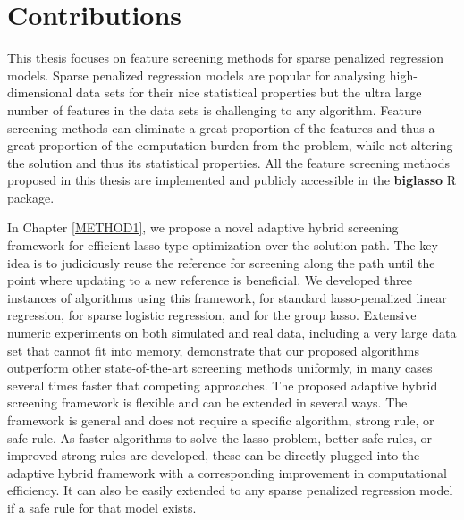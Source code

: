 \label{summary}

\section{Contributions}

This thesis focuses on feature screening methods for sparse penalized regression 
models. Sparse penalized regression models are popular for analysing high-dimensional data sets for their nice statistical properties but the ultra large number of features in the data sets is challenging to any algorithm. Feature screening methods can eliminate a great proportion of the features and thus a great proportion of the computation burden from the problem, while not altering the solution and thus its statistical properties. All the feature screening methods proposed in this thesis are implemented and publicly accessible in the \textbf{biglasso} R package.

In Chapter \ref{METHOD1}, we propose a novel adaptive hybrid screening framework for efficient lasso-type optimization over the solution path. The key idea is to judiciously reuse the reference for screening along the path until the point where updating to a new reference is beneficial. We developed three instances of algorithms using this framework, for standard lasso-penalized linear regression, for sparse logistic regression, and for the group lasso. Extensive numeric experiments on both simulated and real data, including a very large data set that cannot fit into memory, demonstrate that our proposed algorithms outperform other state-of-the-art screening methods uniformly, in many cases several times faster that competing approaches. The proposed adaptive hybrid screening framework is flexible and can be extended in several ways. The framework is general and does not require a specific algorithm, strong rule, or safe rule. As faster algorithms to solve the lasso problem, better safe rules, or improved strong rules are developed, these can be directly plugged into the adaptive hybrid framework with a corresponding improvement in computational efficiency. It can also be easily extended to any sparse penalized regression model if a safe rule for that model exists.

